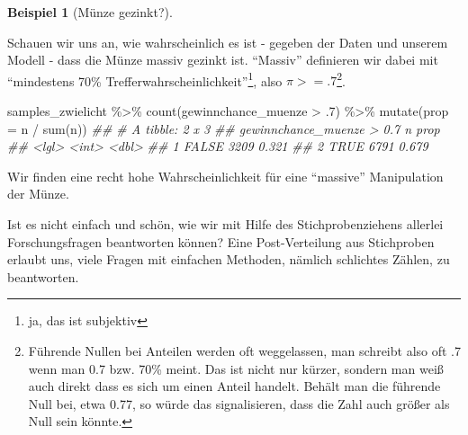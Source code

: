 \documentclass[
  a4paper,
  DIV=11]{scrreprt}
\newenvironment{Shaded}{\begin{snugshade}}{\end{snugshade}}
\newcommand{\AttributeTok}[1]{\textcolor[rgb]{0.40,0.45,0.13}{#1}}
\newcommand{\DecValTok}[1]{\textcolor[rgb]{0.68,0.00,0.00}{#1}}
\newcommand{\DocumentationTok}[1]{\textcolor[rgb]{0.37,0.37,0.37}{\textit{#1}}}
\newcommand{\FunctionTok}[1]{\textcolor[rgb]{0.28,0.35,0.67}{#1}}
\newcommand{\NormalTok}[1]{\textcolor[rgb]{0.00,0.23,0.31}{#1}}
\newcommand{\SpecialCharTok}[1]{\textcolor[rgb]{0.37,0.37,0.37}{#1}}
\theoremstyle{definition}
\newtheorem{example}{Beispiel}[chapter]
\theoremstyle{remark}
\begin{document}
\leavevmode{}%
\begin{example}[Münze gezinkt?]\label{exm-zwielicht2}

Schauen wir uns an, wie wahrscheinlich es ist - gegeben der Daten und
unserem Modell - dass die Münze massiv gezinkt ist. ``Massiv''
definieren wir dabei mit ``mindestens 70\%
Trefferwahrscheinlichkeit''\footnote{ja, das ist subjektiv}, also
\(\pi >= .7\)\footnote{Führende Nullen bei Anteilen werden oft
  weggelassen, man schreibt also oft .7 wenn man 0.7 bzw. 70\% meint.
  Das ist nicht nur kürzer, sondern man weiß auch direkt dass es sich um
  einen Anteil handelt. Behält man die führende Null bei, etwa 0.77, so
  würde das signalisieren, dass die Zahl auch größer als Null sein
  könnte.}.

\begin{Shaded}
\begin{Highlighting}[]
\NormalTok{samples\_zwielicht }\SpecialCharTok{\%\textgreater{}\%} 
  \FunctionTok{count}\NormalTok{(gewinnchance\_muenze }\SpecialCharTok{\textgreater{}}\NormalTok{ .}\DecValTok{7}\NormalTok{) }\SpecialCharTok{\%\textgreater{}\%} 
  \FunctionTok{mutate}\NormalTok{(}\AttributeTok{prop =}\NormalTok{ n }\SpecialCharTok{/} \FunctionTok{sum}\NormalTok{(n))}
\DocumentationTok{\#\# \# A tibble: 2 x 3}
\DocumentationTok{\#\#   \textasciigrave{}gewinnchance\_muenze \textgreater{} 0.7\textasciigrave{}     n  prop}
\DocumentationTok{\#\#   \textless{}lgl\textgreater{}                       \textless{}int\textgreater{} \textless{}dbl\textgreater{}}
\DocumentationTok{\#\# 1 FALSE                        3209 0.321}
\DocumentationTok{\#\# 2 TRUE                         6791 0.679}
\end{Highlighting}
\end{Shaded}

Wir finden eine recht hohe Wahrscheinlichkeit für eine ``massive''
Manipulation der Münze.

\end{example}

\begin{tcolorbox}[enhanced jigsaw, colframe=quarto-callout-important-color-frame, title=\textcolor{quarto-callout-important-color}{\faExclamation}\hspace{0.5em}{Wichtig}, breakable, leftrule=.75mm, coltitle=black, toptitle=1mm, bottomrule=.15mm, bottomtitle=1mm, opacityback=0, arc=.35mm, rightrule=.15mm, left=2mm, colbacktitle=quarto-callout-important-color!10!white, opacitybacktitle=0.6, toprule=.15mm, titlerule=0mm, colback=white]
Ist es nicht einfach und schön, wie wir mit Hilfe des Stichprobenziehens
allerlei Forschungsfragen beantworten können? Eine Post-Verteilung aus
Stichproben erlaubt uns, viele Fragen mit einfachen Methoden, nämlich
schlichtes Zählen, zu beantworten.
\end{tcolorbox}
\end{document}
